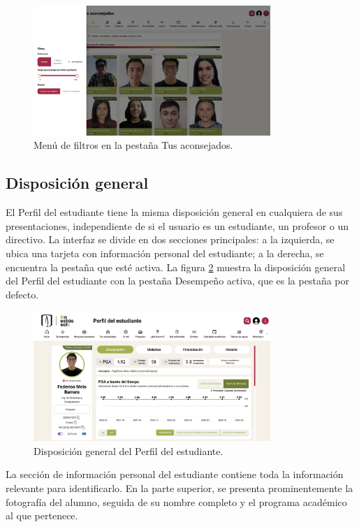 \begin{figure}[H]
  \centering
  \includegraphics[width=0.8\textwidth]{img/nes/filtros.png}
  \caption{Menú de filtros en la pestaña Tus aconsejados.}
  \label{fig:filtros}
\end{figure}

\subsection{Disposición general}

El Perfil del estudiante tiene la misma disposición general en cualquiera de sus presentaciones, independiente de si el usuario es un estudiante, un profesor o un directivo. La interfaz se divide en dos secciones principales: a la izquierda, se ubica una tarjeta con información personal del estudiante; a la derecha, se encuentra la pestaña que esté activa. La figura \ref{fig:perfil} muestra la disposición general del Perfil del estudiante con la pestaña Desempeño activa, que es la pestaña por defecto.

\begin{figure}[H]
  \centering
  \includegraphics[width=0.8\textwidth]{img/nes/perfil.png}
  \caption{Disposición general del Perfil del estudiante.}
  \label{fig:perfil}
\end{figure}

La sección de información personal del estudiante contiene toda la información relevante para identificarlo. En la parte superior, se presenta prominentemente la fotografía del alumno, seguida de su nombre completo y el programa académico al que pertenece. 

